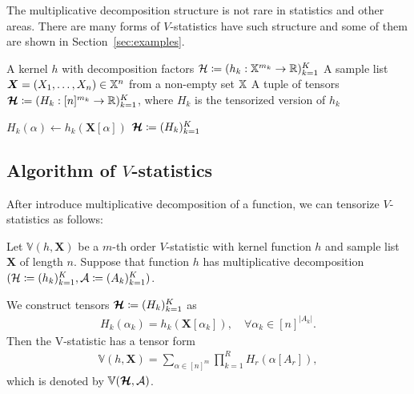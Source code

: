 \documentclass[letterpaper,11pt]{article}
\newcommand{\pdfv}{\texorpdfstring{$V$}{V}}
\newcommand{\vstat}{\mathbb{V}}
\newcommand{\samplespace}{\bbX}
\begin{document}
The multiplicative decomposition structure is not rare in statistics and other areas. There are many forms of $V$-statistics have such structure and some of them are shown in Section~\ref{sec:examples}. 


\begin{algorithm}
    \caption{Tensorization of Kernel Function}
    \label{alg:tensorization}
    \begin{algorithmic}[1]
        \Require 
            \Statex A kernel $h$ with decomposition factors ${\mathcal{H}} \coloneqq (h_k: {\mathbb{X}}^{m_k} \to {\mathbb{R}})_{k=1}^K$
            \Statex A sample list $\bm{X} = (X_1, \dots, X_n) \in \samplespace^n$ from a non-empty set $\samplespace$
        \Ensure A tuple of tensors $\bm{{\mathcal{H}}} \coloneqq (H_k: [n]^{m_k} \to {\mathbb{R}})_{k=1}^K$, where $H_k$ is the tensorized version of $h_k$

                    \State $H_k(\alpha) \gets h_k(\bm{X}[\alpha])$  
                \EndFor
            \EndFor
            \State \Return $\bm{{\mathcal{H}}} \coloneqq (H_k)_{k=1}^K$  
        \EndFunction
    \end{algorithmic}
\end{algorithm}

\subsection{Algorithm of \pdfv{}-statistics}

After introduce multiplicative decomposition of a function, we can tensorize $V$-statistics as follows: 

Let $\vstat(h, \bm{X})$ be a $m$-th order $V$-statistic with kernel function $h$ and sample list $\bm{X}$ of length $n$. Suppose that function $h$ has multiplicative decomposition $({\mathcal{H}} \coloneqq (h_k)_{k=1}^K, {\mathcal{A}} \coloneqq (A_k)_{k=1}^K)$. 

We construct tensors $\bm{{\mathcal{H}}} \coloneqq (H_k)_{k=1}^K$ as
\begin{align}\label{eq:tesorizing}
    H_k(\alpha_k) = h_k(\bm{X}[\alpha_k]), \quad \forall \alpha_k \in [n]^{|A_k|}. 
\end{align}
Then the V-statistic has a tensor form
\begin{align*}
    \vstat(h, \bm{X}) = \sum_{\alpha \in [n]^m} \prod_{k=1}^R H_r(\alpha[A_r]), 
\end{align*}
which is denoted by $\vstat(\bm{\calH}, \calA)$. 
\end{document}
